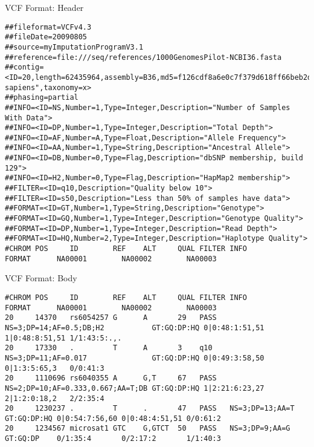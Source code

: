 \documentclass{beamer}
\begin{document}
\begin{frame}[fragile]{VCF Format: Header}
\scriptsize{
\begin{lstlisting}[frame = single, breaklines = true]
##fileformat=VCFv4.3
##fileDate=20090805
##source=myImputationProgramV3.1
##reference=file:///seq/references/1000GenomesPilot-NCBI36.fasta
##contig=<ID=20,length=62435964,assembly=B36,md5=f126cdf8a6e0c7f379d618ff66beb2da,species="Homo sapiens",taxonomy=x>
##phasing=partial
##INFO=<ID=NS,Number=1,Type=Integer,Description="Number of Samples With Data">
##INFO=<ID=DP,Number=1,Type=Integer,Description="Total Depth">
##INFO=<ID=AF,Number=A,Type=Float,Description="Allele Frequency">
##INFO=<ID=AA,Number=1,Type=String,Description="Ancestral Allele">
##INFO=<ID=DB,Number=0,Type=Flag,Description="dbSNP membership, build 129">
##INFO=<ID=H2,Number=0,Type=Flag,Description="HapMap2 membership">
##FILTER=<ID=q10,Description="Quality below 10">
##FILTER=<ID=s50,Description="Less than 50% of samples have data">
##FORMAT=<ID=GT,Number=1,Type=String,Description="Genotype">
##FORMAT=<ID=GQ,Number=1,Type=Integer,Description="Genotype Quality">
##FORMAT=<ID=DP,Number=1,Type=Integer,Description="Read Depth">
##FORMAT=<ID=HQ,Number=2,Type=Integer,Description="Haplotype Quality">
#CHROM POS     ID        REF    ALT     QUAL FILTER INFO                              FORMAT      NA00001        NA00002        NA00003
\end{lstlisting}
}
\end{frame}

\begin{frame}[fragile]{VCF Format: Body}
\scriptsize{
\begin{lstlisting}[frame = single, breaklines = true, keepspaces = false, columns = flexible]
#CHROM POS     ID        REF    ALT     QUAL FILTER INFO                              FORMAT      NA00001        NA00002        NA00003
20     14370   rs6054257 G      A       29   PASS   NS=3;DP=14;AF=0.5;DB;H2           GT:GQ:DP:HQ 0|0:48:1:51,51 1|0:48:8:51,51 1/1:43:5:.,.
20     17330   .         T      A       3    q10    NS=3;DP=11;AF=0.017               GT:GQ:DP:HQ 0|0:49:3:58,50 0|1:3:5:65,3   0/0:41:3
20     1110696 rs6040355 A      G,T     67   PASS   NS=2;DP=10;AF=0.333,0.667;AA=T;DB GT:GQ:DP:HQ 1|2:21:6:23,27 2|1:2:0:18,2   2/2:35:4
20     1230237 .         T      .       47   PASS   NS=3;DP=13;AA=T                   GT:GQ:DP:HQ 0|0:54:7:56,60 0|0:48:4:51,51 0/0:61:2
20     1234567 microsat1 GTC    G,GTCT  50   PASS   NS=3;DP=9;AA=G                    GT:GQ:DP    0/1:35:4       0/2:17:2       1/1:40:3
\end{lstlisting}
}
\end{frame}
\end{document}
